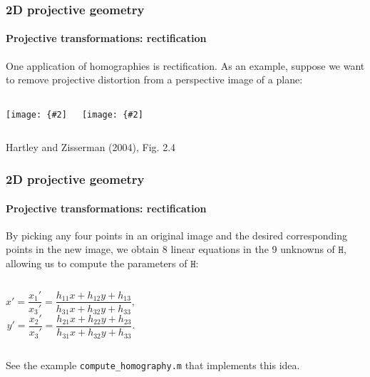 \documentclass[aspectratio=169]{beamer}
\newcommand{\mat}[1]{\mathtt{#1}}
\newcommand{\myfig}[3]{\centerline{\texttt{[image: \{\#2]}}}
\begin{document}
\begin{frame}
\frametitle{2D projective geometry}
\framesubtitle{Projective transformations: rectification}

One application of homographies is \alert{rectification}.  As an
example, suppose we want to remove projective distortion from a
perspective image of a plane:

\begin{columns}
\column{2in}
\myfig{1.9in}{HZ-fig1-4a}{(a)}
\column{2in}
\myfig{1.9in}{HZ-fig1-4b}{(b)}
\end{columns}
\centerline{Hartley and Zisserman (2004), Fig. 2.4}

\end{frame}

\begin{frame}
\frametitle{2D projective geometry}
\framesubtitle{Projective transformations: rectification}

By picking any four points in an original image and the desired
corresponding points in the new image, we obtain 8 linear equations in
the 9 unknowns of $\mat{H}$, allowing us to compute the parameters of
$\mat{H}$:

\begin{columns}
\column{2in}
\begin{equation*}
x' = \frac{x_1'}{x_3'} =
\frac{h_{11}x+h_{12}y+h_{13}}{h_{31}x+h_{32}y+h_{33}},
\end{equation*}
\column{2in}
\begin{equation*}
y' = \frac{x_2'}{x_3'} =
\frac{h_{21}x+h_{22}y+h_{23}}{h_{31}x+h_{32}y+h_{33}}.
\end{equation*}
\end{columns}

\bigskip

\bigskip

See the example \texttt{compute\_homography.m} that implements this
idea.

\end{frame}
\end{document}
